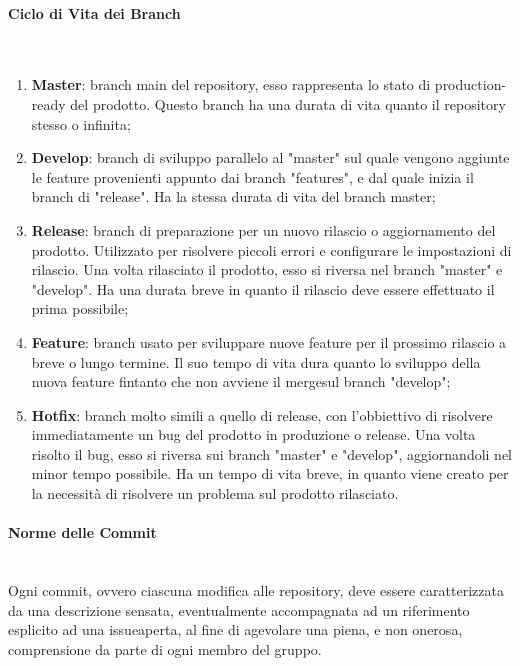 \paragraph{Ciclo di Vita dei Branch} \-\\
\begin{enumerate}

	\item \textbf{Master}: branch main del repository, esso rappresenta lo stato di production-ready del prodotto. Questo branch ha una durata di vita quanto il repository stesso o infinita;
	\item \textbf{Develop}: branch di sviluppo parallelo al "master" sul quale vengono aggiunte le feature provenienti appunto dai branch "features", e dal quale inizia il branch di "release". Ha la stessa durata di vita del branch master;

	\item \textbf{Release}: branch di preparazione per un nuovo rilascio o aggiornamento del prodotto.
	Utilizzato per risolvere piccoli errori e configurare le impostazioni di rilascio. Una volta rilasciato il
	prodotto, esso si riversa nel branch "master" e "develop". Ha una durata breve in quanto il rilascio deve essere effettuato il prima possibile;

	\item \textbf{Feature}: branch usato per sviluppare nuove feature per il prossimo rilascio a breve o lungo termine. Il suo tempo di vita dura quanto lo sviluppo della nuova feature
	fintanto che non avviene il merge\glossario sul branch "develop";

	\item \textbf{Hotfix}: branch molto simili a quello di release, con l'obbiettivo di risolvere immediatamente un bug del prodotto in produzione o release. Una volta risolto il bug,
	esso si riversa sui branch "master" e "develop", aggiornandoli nel minor tempo possibile. Ha un tempo di vita breve, in quanto viene creato per la necessità di risolvere
	un problema sul prodotto rilasciato.

\end{enumerate}

\paragraph{Norme delle Commit} ~\\
Ogni commit\glossario, ovvero ciascuna modifica alle repository, deve essere caratterizzata da una descrizione sensata, eventualmente accompagnata ad un riferimento esplicito ad una issue\glossario aperta, al fine di agevolare una piena, e non onerosa, comprensione da parte di ogni membro del gruppo.

